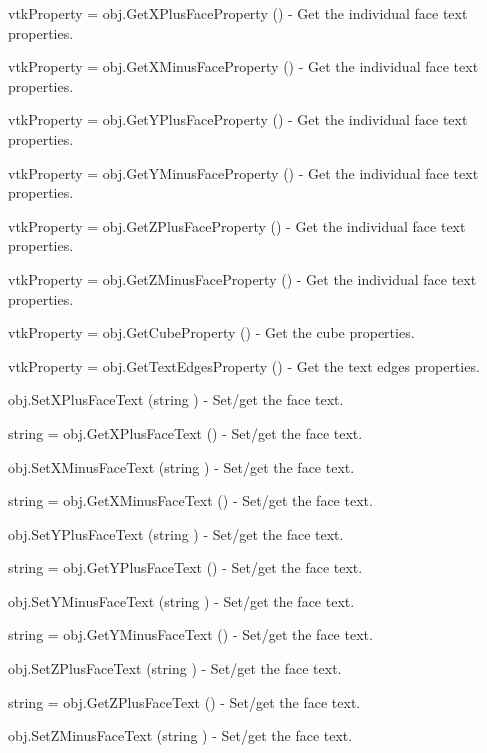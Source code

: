 \begin{DoxyItemize}
\item {\ttfamily vtk\-Property = obj.\-Get\-X\-Plus\-Face\-Property ()} -\/ Get the individual face text properties.  
\item {\ttfamily vtk\-Property = obj.\-Get\-X\-Minus\-Face\-Property ()} -\/ Get the individual face text properties.  
\item {\ttfamily vtk\-Property = obj.\-Get\-Y\-Plus\-Face\-Property ()} -\/ Get the individual face text properties.  
\item {\ttfamily vtk\-Property = obj.\-Get\-Y\-Minus\-Face\-Property ()} -\/ Get the individual face text properties.  
\item {\ttfamily vtk\-Property = obj.\-Get\-Z\-Plus\-Face\-Property ()} -\/ Get the individual face text properties.  
\item {\ttfamily vtk\-Property = obj.\-Get\-Z\-Minus\-Face\-Property ()} -\/ Get the individual face text properties.  
\item {\ttfamily vtk\-Property = obj.\-Get\-Cube\-Property ()} -\/ Get the cube properties.  
\item {\ttfamily vtk\-Property = obj.\-Get\-Text\-Edges\-Property ()} -\/ Get the text edges properties.  
\item {\ttfamily obj.\-Set\-X\-Plus\-Face\-Text (string )} -\/ Set/get the face text.  
\item {\ttfamily string = obj.\-Get\-X\-Plus\-Face\-Text ()} -\/ Set/get the face text.  
\item {\ttfamily obj.\-Set\-X\-Minus\-Face\-Text (string )} -\/ Set/get the face text.  
\item {\ttfamily string = obj.\-Get\-X\-Minus\-Face\-Text ()} -\/ Set/get the face text.  
\item {\ttfamily obj.\-Set\-Y\-Plus\-Face\-Text (string )} -\/ Set/get the face text.  
\item {\ttfamily string = obj.\-Get\-Y\-Plus\-Face\-Text ()} -\/ Set/get the face text.  
\item {\ttfamily obj.\-Set\-Y\-Minus\-Face\-Text (string )} -\/ Set/get the face text.  
\item {\ttfamily string = obj.\-Get\-Y\-Minus\-Face\-Text ()} -\/ Set/get the face text.  
\item {\ttfamily obj.\-Set\-Z\-Plus\-Face\-Text (string )} -\/ Set/get the face text.  
\item {\ttfamily string = obj.\-Get\-Z\-Plus\-Face\-Text ()} -\/ Set/get the face text.  
\item {\ttfamily obj.\-Set\-Z\-Minus\-Face\-Text (string )} -\/ Set/get the face text.  

\end{DoxyItemize}
